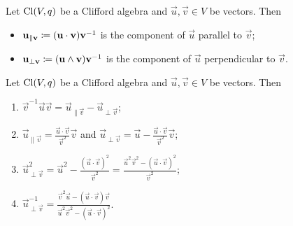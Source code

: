 \begin{definition}
Let $\operatorname{Cl}(V,q)$ be a Clifford algebra and $\vec{u},\vec{v}\in V$ be vectors. Then
\begin{itemize}
\item $\boldsymbol{\mathrm{u}}_{\parallel \boldsymbol{\mathrm{v}}} \coloneqq (\boldsymbol{\mathrm{u}}\cdot \boldsymbol{\mathrm{v}})\boldsymbol{\mathrm{v}}^{-1}$ is the component of $\vec{u}$ parallel to $\vec{v}$;
\item $\boldsymbol{\mathrm{u}}_{\perp \boldsymbol{\mathrm{v}}} \coloneqq (\boldsymbol{\mathrm{u}}\wedge \boldsymbol{\mathrm{v}})\boldsymbol{\mathrm{v}}^{-1}$ is the component of $\vec{u}$ perpendicular to $\vec{v}$.
\end{itemize}
\end{definition}

\begin{lemma} \label{parallelPerpendicularComponentConstructions}
Let $\operatorname{Cl}(V,q)$ be a Clifford algebra and $\vec{u},\vec{v}\in V$ be vectors. Then
\begin{enumerate}
\item $\vec{v}^{-1}\vec{u}\vec{v} = \vec{u}_{\parallel \vec{v}} - \vec{u}_{\perp \vec{v}}$;
\item $\vec{u}_{\parallel\vec{v}} = \frac{\vec{u}\cdot \vec{v}}{\vec{v}^2}\vec{v}$ and $\vec{u}_{\perp \vec{v}} = \vec{u} - \frac{\vec{u}\cdot \vec{v}}{\vec{v}^2}\vec{v}$;
\item $\vec{u}_{\perp \vec{v}}^2 = \vec{u}^2 - \frac{(\vec{u}\cdot \vec{v})^2}{\vec{v}^2} = \frac{\vec{u}^2 \vec{v}^2 - (\vec{u}\cdot \vec{v})^2}{\vec{v}^2}$;
\item $\vec{u}_{\perp \vec{v}}^{-1} = \frac{\vec{v}^2 \vec{u} - (\vec{u}\cdot\vec{v})\vec{v}}{\vec{u}^2 \vec{v}^2 - (\vec{u}\cdot \vec{v})^2}$.
\end{enumerate}
\end{lemma}
